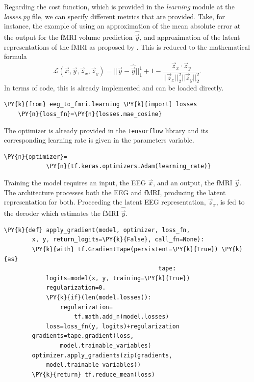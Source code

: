 Regarding the cost function, which is provided in the \textit{learning} module at the \textit{losses.py} file, we can specify different metrics that are provided. Take, for instance, the example of using an approximation of the mean absolute error at the output for the fMRI volume prediction $\hat{\vec{y}}$, and approximation of the latent representations of the fMRI as proposed by \cite{calhas2022eeg}. This is reduced to the mathematical formula
\begin{equation}\label{equation:loss}
    \mathcal{L}(\vec{x}, \vec{y}, \vec{z}_x, \vec{z}_y) = ||\vec{y} - \hat{\vec{y}}||_1^1 + 1 - \frac{\vec{z}_x \cdot \vec{z}_y}{||\vec{z}_x||_2^2 ||\vec{z}_y||_2^2}.
\end{equation}
In terms of code, this is already implemented and can be loaded directly.
\begin{Verbatim}[commandchars=\\\{\},fontsize=\footnotesize]
    \PY{k}{from} eeg_to_fmri.learning \PY{k}{import} losses
    \PY{n}{loss_fn}=\PY{n}{losses.mae_cosine}
\end{Verbatim}
The optimizer is already provided in the \texttt{tensorflow} library and its corresponding learning rate is given in the parameters variable.
\begin{Verbatim}[commandchars=\\\{\},fontsize=\footnotesize]
    \PY{n}{optimizer}=
            \PY{n}{tf.keras.optimizers.Adam(learning_rate)}
\end{Verbatim}
Training the model requires an input, the EEG $\vec{x}$, and an output, the fMRI $\vec{y}$. The architecture processes both the EEG and fMRI, producing the latent representation for both. Proceeding the latent EEG representation, $\vec{z}_x$, is fed to the decoder which estimates the fMRI $\hat{\vec{y}}$.
\begin{Verbatim}[commandchars=\\\{\},fontsize=\footnotesize]
    \PY{k}{def} apply_gradient(model, optimizer, loss_fn, 
        x, y, return_logits=\PY{k}{False}, call_fn=None):
        \PY{k}{with} tf.GradientTape(persistent=\PY{k}{True}) \PY{k}{as}
                                            tape:
            logits=model(x, y, training=\PY{k}{True})
            regularization=0.
            \PY{k}{if}(len(model.losses)):
                regularization=
                    tf.math.add_n(model.losses)
            loss=loss_fn(y, logits)+regularization
        gradients=tape.gradient(loss, 
                model.trainable_variables)
        optimizer.apply_gradients(zip(gradients,
            model.trainable_variables))
        \PY{k}{return} tf.reduce_mean(loss)
\end{Verbatim}
